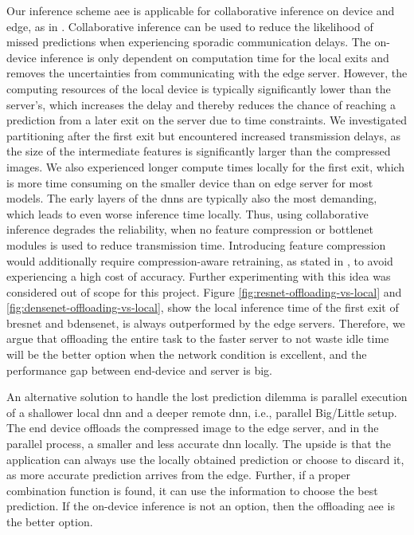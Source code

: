 Our inference scheme \gls{aee} is applicable for collaborative inference on device and edge, as in \cite{leroux_cascading_2017,teerapittayanon_distributed_2017}. Collaborative inference can be used to reduce the likelihood of missed predictions when experiencing sporadic communication delays. The on-device inference is only dependent on computation time for the local exits and removes the uncertainties from communicating with the edge server. However, the computing resources of the local device is typically significantly lower than the server's, which increases the delay and thereby reduces the chance of reaching a prediction from a later exit on the server due to time constraints. We investigated partitioning after the first exit but encountered increased transmission delays, as the size of the intermediate features is significantly larger than the compressed images. We also experienced longer compute times locally for the first exit, which is more time consuming on the smaller device than on edge server for most models. The early layers of the \gls{dnn}s are typically also the most demanding, which leads to even worse inference time locally. Thus, using collaborative inference degrades the reliability, when no feature compression or \gls{bottlenet} modules is used to reduce transmission time. Introducing feature compression would additionally require compression-aware retraining, as stated in \cite{choi_near-lossless_2018,choi_near-lossless_2018,eshratifar_bottlenet:_2019},  to avoid experiencing a high cost of accuracy. Further experimenting with this idea was considered out of scope for this project. Figure \ref{fig:resnet-offloading-vs-local} and \ref{fig:densenet-offloading-vs-local}, show the local inference time of the first exit of \gls{bresnet} and \gls{bdensenet}, is always outperformed by the edge servers. Therefore, we argue that offloading the entire task to the faster server to not waste idle time will be the better option when the network condition is excellent, and the performance gap between end-device and server is big.

An alternative solution to handle the lost prediction dilemma is parallel execution of a shallower local \gls{dnn} and a deeper remote \gls{dnn}, i.e., parallel Big/Little setup. The end device offloads the compressed image to the edge server, and in the parallel process, a smaller and less accurate \gls{dnn} locally. The upside is that the application can always use the locally obtained prediction or choose to discard it, as more accurate prediction arrives from the edge. Further, if a proper combination function is found, it can use the information to choose the best prediction. If the on-device inference is not an option, then the offloading \gls{aee} is the better option.

